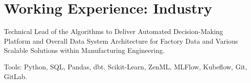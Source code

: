 \documentclass[]{template}
\begin{document}

\sectionsep%

\sectionsep
\section{Working Experience: Industry}

\sectionsep
{}

\vspace{\topsep}

\begin{tightemize}
\item Technical Lead of the Algorithms to Deliver Automated Decision-Making Platform and Overall Data System Architecture for Factory Data and Various Scalable Solutions within Manufacturing Engineering.

\item Tools: Python, SQL, Pandas, dbt. Scikit-Learn, ZenML, MLFlow, Kubeflow, Git, GitLab.
\end{tightemize}


\sectionsep
{}

\vspace{\topsep}
\end{document}
